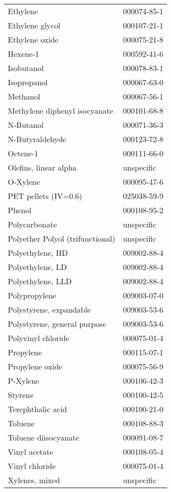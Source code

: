 \begin{longtable}[c]{@{}ll@{}}
Ethylene                         & 000074-85-1 \\
Ethylene glycol                  & 000107-21-1 \\
Ethylene oxide                   & 000075-21-8 \\
Hexene-1                         & 000592-41-6 \\
Isobutanol                       & 000078-83-1 \\
Isopropanol                      & 000067-63-0 \\
Methanol                         & 000067-56-1 \\
Methylene diphenyl isocyanate    & 000101-68-8 \\
N-Butanol                        & 000071-36-3 \\
N-Butyraldehyde                  & 000123-72-8 \\
Octene-1                         & 000111-66-0 \\
Olefins, linear alpha            & unspecific  \\
O-Xylene                         & 000095-47-6 \\
PET pellets (IV=0.6)             & 025038-59-9 \\
Phenol                           & 000108-95-2 \\
Polycarbonate                    & unspecific  \\
Polyether Polyol (trifunctional) & unspecific  \\
Polyethylene, HD                 & 009002-88-4 \\
Polyethylene, LD                 & 009002-88-4 \\
Polyethylene, LLD                & 009002-88-4 \\
Polypropylene                    & 009003-07-0 \\
Polystyrene, expandable          & 009003-53-6 \\
Polystyrene, general purpose     & 009003-53-6 \\
Polyvinyl chloride               & 000075-01-4 \\
Propylene                        & 000115-07-1 \\
Propylene oxide                  & 000075-56-9 \\
P-Xylene                         & 000106-42-3 \\
Styrene                          & 000100-42-5 \\
Terephthalic acid                & 000100-21-0 \\
Toluene                          & 000108-88-3 \\
Toluene diisocyanate             & 000091-08-7 \\
Vinyl acetate                    & 000108-05-4 \\
Vinyl chloride                   & 000075-01-4 \\
Xylenes, mixed                   & unspecific  \\* \bottomrule
\end{longtable}



